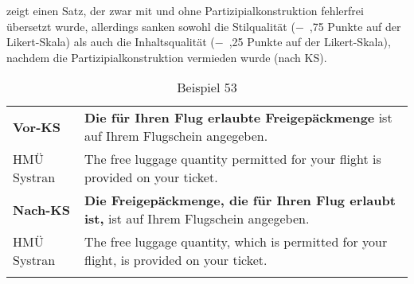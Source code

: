 \begin{figure}














\captionsetup{width=.45\textwidth}
\begin{floatrow}
\end{floatrow}

\end{figure}

 zeigt einen Satz, der zwar mit und ohne Partizipialkonstruktion fehlerfrei übersetzt wurde, allerdings sanken sowohl die Stilqualität ($-$~,75 Punkte auf der Likert-Skala) als auch die Inhaltsqualität ($-$~,25 Punkte auf der Likert-Skala), nachdem die Partizipialkonstruktion vermieden wurde (nach KS).


\begin{table}
\begin{tabularx}{\textwidth}{lX}

\lsptoprule

\textbf{Vor-KS} & \textbf{Die für Ihren Flug erlaubte Freigepäckmenge} ist auf Ihrem Flugschein angegeben.\\
\tablevspace
HMÜ Systran & \textcolor{tmnlpthree}{The free luggage quantity permitted for your flight} is provided on your ticket.\\
\midrule
\textbf{Nach-KS} & \textbf{Die Freigepäckmenge, die für Ihren Flug erlaubt ist,} ist auf Ihrem Flugschein angegeben.\\
\tablevspace
HMÜ Systran & \textcolor{tmnlpthree}{The free luggage quantity, which is permitted for your flight,} is provided on your ticket.\\
\lspbottomrule
\end{tabularx}
\caption{\label{tabex:05:53}Beispiel 53   }
\end{table}

